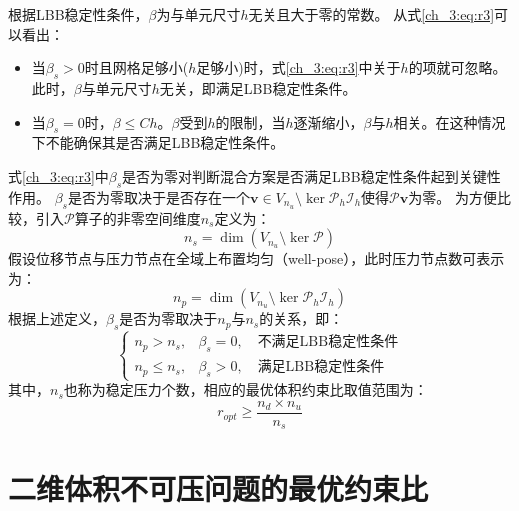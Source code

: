 根据LBB稳定性条件，$\beta$为与单元尺寸$h$无关且大于零的常数。
从式\eqref{ch_3:eq:r3}可以看出：
\begin{itemize}
    \item 当$\beta_s> 0$时且网格足够小($h$足够小)时，式\eqref{ch_3:eq:r3}中关于$h$的项就可忽略。此时，$\beta$与单元尺寸$h$无关，即满足LBB稳定性条件。
    \item 当$\beta_s= 0$时，$\beta\leq Ch$。$\beta$受到$h$的限制，当$h$逐渐缩小，$\beta$与$h$相关。在这种情况下不能确保其是否满足LBB稳定性条件。
\end{itemize}

式\eqref{ch_3:eq:r3}中$\beta_s$是否为零对判断混合方案是否满足LBB稳定性条件起到关键性作用。
$\beta_s$是否为零取决于是否存在一个$\boldsymbol v \in V_{n_u}\setminus\ker \mathcal P_h \mathcal I_h$使得$\mathcal P \boldsymbol v$为零。
为方便比较，引入$\mathcal P$算子的非零空间维度$n_s$定义为：
\begin{equation}
    n_s = \dim(V_{n_u}\setminus \ker \mathcal P)
\end{equation}
假设位移节点与压力节点在全域上布置均匀（well-pose），此时压力节点数可表示为：
\begin{equation}
    n_p = \dim(V_{n_u}\setminus \ker \mathcal P_h \mathcal I_h)
\end{equation}
根据上述定义，$\beta_s$是否为零取决于$n_p$与$n_s$的关系，即：
\begin{equation}
    \begin{cases} 
        n_p > n_s, & \beta_s = 0, \quad \text{不满足LBB稳定性条件} \\
        n_p \le n_s, & \beta_s > 0, \quad \text{满足LBB稳定性条件}
    \end{cases} 
\end{equation}
其中，$n_s$也称为稳定压力个数，相应的最优体积约束比取值范围为：
\begin{equation}
    r_{opt} \ge \frac{n_d\times n_u}{n_s} 
\end{equation}

\section{二维体积不可压问题的最优约束比}

